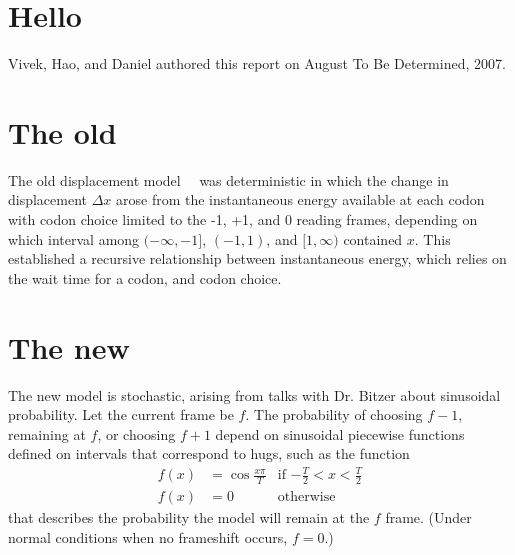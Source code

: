 \documentclass[10pt,titlepage,twocolumn, draft]{article}
\begin{document}
\section*{Hello}
Vivek, Hao, and Daniel authored this report on August To Be Determined, 2007.

\section{The old}
The old displacement model~\cite{lalit:mechanics}~\cite{lalit:embs} was deterministic
in which the change in displacement $\Delta x$ arose from the instantaneous energy available at
each codon with codon choice limited to the -1, +1, and 0 reading frames, depending on
which interval among $(-\infty, -1]$, $(-1,1)$, and $[1, \infty)$ contained $x$.
This established a recursive relationship between instantaneous energy,
which relies on the wait time for a codon, and codon choice.

\section{The new}
The new model is stochastic, arising from talks with Dr. Bitzer about sinusoidal probability.
Let the current frame be $f$. The probability of choosing
$f-1$, remaining at $f$, or choosing $f+1$ depend on sinusoidal piecewise functions defined
on intervals that correspond to hugs, such as the function
    \begin{align}
        f(x) &=  \cos \frac{x \pi}{T}  & \text{if $-\frac{T}{2} < x < \frac{T}{2}$}\\
        f(x) &=  0 & \text{otherwise}
    \end{align}
that describes the probability the model will remain at the $f$ frame. (Under normal conditions
when no frameshift occurs, $f = 0$.)


\end{document}
